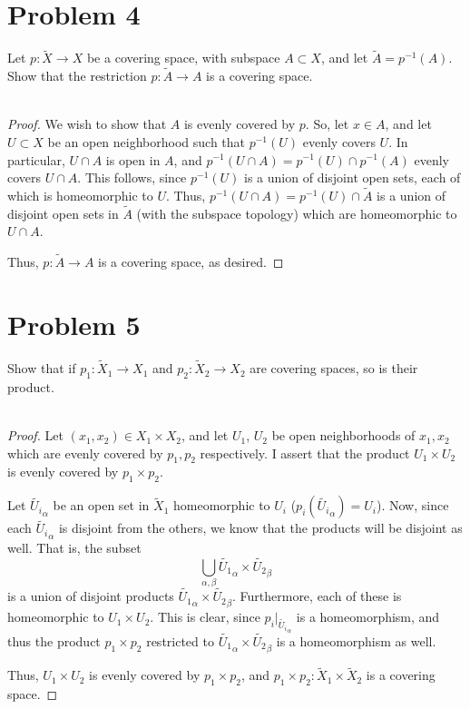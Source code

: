 \documentclass[fontsize=11pt]{scrartcl} %
\numberwithin{equation}{section} %
\numberwithin{figure}{section} %
\numberwithin{table}{section} %
\begin{document}
\section*{Problem 4}
Let $p:\tilde{X}\to X$ be a covering space, with subspace $A\subset X$, and let
$\tilde{A}=p^{-1}(A)$. Show that the restriction $p:\tilde{A}\to A$ is a
covering space.
\\
\\
\begin{proof}
    We wish to show that $A$ is evenly covered by $p$. So, let $x\in A$, and let
    $U\subset X$ be an open neighborhood such  that $p^{-1}(U)$ evenly covers
    $U$. In particular, $U\cap A$ is open in $A$, and $p^{-1}(U\cap
    A)=p^{-1}(U)\cap p^{-1}(A)$ evenly covers $U\cap A$. This follows, since
    $p^{-1}(U)$ is a union of disjoint open sets, each of which is homeomorphic
    to $U$. Thus, $p^{-1}(U\cap A) = p^{-1}(U)\cap \tilde{A}$ is a union of
        disjoint open sets in $\tilde{A}$ (with the subspace topology) which are
        homeomorphic to $U\cap A$.

        Thus, $p:\tilde{A}\to A$ is a covering space, as desired.
\end{proof}

\section*{Problem 5}
Show that if $p_1:\tilde{X}_1\to X_1$ and $p_2:\tilde{X}_2\to X_2$ are covering
spaces, so is their product.
\\
\\
\begin{proof}
    Let $(x_1,x_2)\in X_1\times X_2$, and let $U_1$, $U_2$ be open neighborhoods
    of $x_1,x_2$ which are evenly covered by $p_1,p_2$ respectively. I assert
    that the product $U_1\times U_2$ is evenly covered by $p_1\times p_2$.

    Let $\tilde{U_i}_{\alpha}$ be an open set in $\tilde{X}_1$ homeomorphic to
    $U_i$ ($p_i(\tilde{U_i}_{\alpha}) = U_i$). Now, since each
    $\tilde{U_i}_{\alpha}$ is disjoint from the others, we know that the
    products will be disjoint as well. That is, the subset
    \[
        \bigcup_{\alpha,\beta}\tilde{U_1}_{\alpha}\times\tilde{U_2}_{\beta}
    \]
    is a union of disjoint products
    $\tilde{U_1}_{\alpha}\times\tilde{U_2}_{\beta}$. Furthermore, each of these
    is homeomorphic to $U_1\times U_2$. This is clear, since
    $p_i|_{\tilde{U_i}_{\alpha}}$ is a homeomorphism, and thus the product
    $p_1\times p_2$ restricted to
    $\tilde{U_1}_{\alpha}\times\tilde{U_2}_{\beta}$ is a homeomorphism as well.

    Thus, $U_1\times U_2$ is evenly covered by $p_1\times p_2$, and $p_1\times
    p_2:\tilde{X}_1\times \tilde{X}_2$ is a covering space.
\end{proof}
\end{document}
